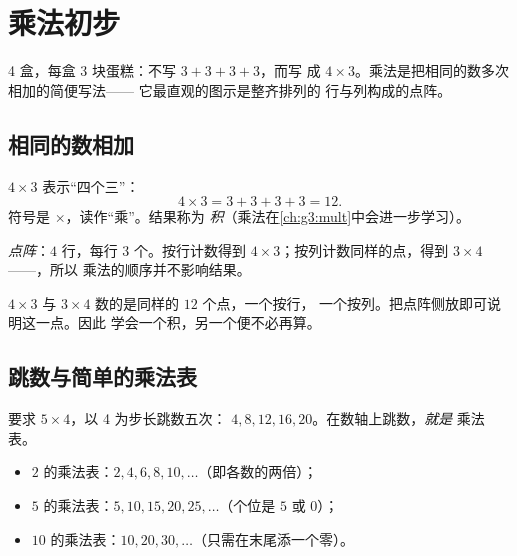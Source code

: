 \chapter{乘法初步}\label{ch:g2:mult}

4 盒，每盒 3 块蛋糕：不写 $3 + 3 + 3 + 3$，而写
成 $4 \times 3$。乘法是把相同的数多次相加的简便写法——
它最直观的图示是整齐排列的
行与列构成的点阵。

\section{相同的数相加}

\begin{definition}[乘法]\label{def:g2:mult:def}
$4 \times 3$ 表示“四个三”：
\[
4 \times 3 = 3 + 3 + 3 + 3 = 12 .
\]
符号是 $\times$，读作“乘”。结果称为
\emph{积}（乘法在\cref{ch:g3:mult}中会进一步学习）。
\end{definition}

\begin{omfigure}

{\small \emph{点阵}：$4$ 行，每行 $3$ 个。按行计数得到
$4 \times 3$；按列计数同样的点，得到 $3 \times 4$——，所以
乘法的顺序并不影响结果。}
\end{omfigure}

\begin{example}[顺序无关]\label{ex:g2:mult:order}
$4 \times 3$ 与 $3 \times 4$ 数的是同样的 $12$ 个点，一个按行，
一个按列。把点阵侧放即可说明这一点。因此
学会一个积，另一个便不必再算。
\end{example}

\section{跳数与简单的乘法表}

\begin{method}[用跳数编制乘法表]\label{met:g2:mult:skip}
要求 $5 \times 4$，以 4 为步长跳数五次：
$4, 8, 12, 16, 20$。在数轴上跳数，\emph{就是}
乘法表。
\begin{itemize}
  \item $2$ 的乘法表：$2, 4, 6, 8, 10, \dots$（即各数的两倍）；
  \item $5$ 的乘法表：$5, 10, 15, 20, 25, \dots$（个位是 $5$ 或
        $0$）；
  \item $10$ 的乘法表：$10, 20, 30, \dots$（只需在末尾添一个零）。
\end{itemize}
\end{method}

